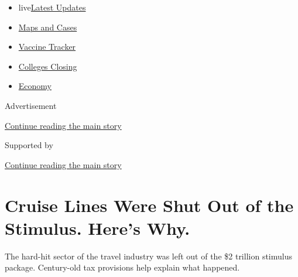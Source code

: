 \begin{itemize}
\tightlist
\item
  live\href{https://www.nytimes3xbfgragh.onion/2020/08/20/world/coronavirus-covid.html?name=styln-coronavirus-national\&region=TOP_BANNER\&variant=undefined\&block=storyline_menu_recirc\&action=click\&pgtype=Article\&impression_id=42156fe1-e388-11ea-adda-c17bab336bc5}{Latest
  Updates}
\item
  \href{https://www.nytimes3xbfgragh.onion/interactive/2020/us/coronavirus-us-cases.html?name=styln-coronavirus-national\&region=TOP_BANNER\&variant=undefined\&block=storyline_menu_recirc\&action=click\&pgtype=Article\&impression_id=42156fe2-e388-11ea-adda-c17bab336bc5}{Maps
  and Cases}
\item
  \href{https://www.nytimes3xbfgragh.onion/interactive/2020/science/coronavirus-vaccine-tracker.html?name=styln-coronavirus-national\&region=TOP_BANNER\&variant=undefined\&block=storyline_menu_recirc\&action=click\&pgtype=Article\&impression_id=42156fe3-e388-11ea-adda-c17bab336bc5}{Vaccine
  Tracker}
\item
  \href{https://www.nytimes3xbfgragh.onion/2020/08/19/us/colleges-closing-covid.html?name=styln-coronavirus-national\&region=TOP_BANNER\&variant=undefined\&block=storyline_menu_recirc\&action=click\&pgtype=Article\&impression_id=42156fe4-e388-11ea-adda-c17bab336bc5}{Colleges
  Closing}
\item
  \href{https://www.nytimes3xbfgragh.onion/live/2020/08/20/business/stock-market-today-coronavirus?name=styln-coronavirus-national\&region=TOP_BANNER\&variant=undefined\&block=storyline_menu_recirc\&action=click\&pgtype=Article\&impression_id=42156fe5-e388-11ea-adda-c17bab336bc5}{Economy}
\end{itemize}

Advertisement

\protect\hyperlink{after-top}{Continue reading the main story}

Supported by

\protect\hyperlink{after-sponsor}{Continue reading the main story}

\hypertarget{cruise-lines-were-shut-out-of-the-stimulus-heres-why}{%
\section{Cruise Lines Were Shut Out of the Stimulus. Here's
Why.}\label{cruise-lines-were-shut-out-of-the-stimulus-heres-why}}

The hard-hit sector of the travel industry was left out of the \$2
trillion stimulus package. Century-old tax provisions help explain what
happened.

